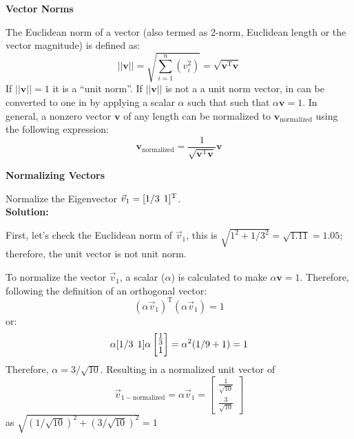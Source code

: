 \documentclass[12pt,letter]{article}
\begin{document}
	
		\begin{review}	
		\textbf{Vector Norms} 
		
	\noindent The Euclidean norm of a vector (also termed as 2-norm, Euclidean length or the vector magnitude) is defined as:
	\begin{equation}
	||\textbf{v}|| = \sqrt{\sum_{i=1}^{n}(v_i^2)} = \sqrt{\textbf{v}^{\text{T}}\textbf{v}}
	\end{equation} 
	If $||\textbf{v}|| = 1$ it is a ``unit norm''. If $||\textbf{v}||$ is not a a unit norm vector, in can be converted to one in by applying a scalar $\alpha$ such that such that $\alpha\textbf{v}=1$. In general, a nonzero vector $\textbf{v}$ of any length can be normalized to $\textbf{v}_\text{normalized}$ using the following expression:
		\begin{equation}
		\textbf{v}_\text{normalized} = \frac{1}{\sqrt{\textbf{v}^{\text{T}}\textbf{v}} } \textbf{v}
		\end{equation}
	\end{review}	

	
	
	 
	
	\begin{example}
	\label{ex:vector_normalizeation}

	\textbf{Normalizing Vectors}

	\noindent Normalize the Eigenvector $\vec{v}_1=[1/3 \hspace{1ex} 1]^\text{T}$. \\
		
	\noindent \textbf{Solution:} 
	
	\noindent First, let's check the Euclidean norm of $\vec{v}_1$, this is $\sqrt{1^2+1/3^2} = \sqrt{1.11} = 1.05$; therefore, the unit vector is not unit norm.
	
	To normalize the vector $\vec{v}_1$, a scalar ($\alpha$) is calculated to make $\alpha\textbf{v}=1$.  Therefore, following the definition of an orthogonal vector:
	\begin{equation}
	(\alpha \vec{v}_1)^\text{T}(\alpha \vec{v}_1) = 1
	\end{equation}
	or:
	\begin{equation}
	\alpha [1/3 \hspace{1ex} 1]\alpha  \begin{bmatrix} \frac{1}{3}\\  1 \end{bmatrix}  = \alpha^2(1/9+1) = 1
	\end{equation}
	Therefore, $\alpha=3/\sqrt{10}$. Resulting in a normalized unit vector of
	\begin{equation}
		\vec{v}_{1-\text{normalized}} = \alpha\vec{v}_1= \begin{bmatrix} \frac{1}{\sqrt{10}}\\  \frac{3}{\sqrt{10}} \end{bmatrix}
		\end{equation}
		 as $\sqrt{(1/\sqrt{10})^2 + (3/\sqrt{10})^2} =1$
	
	\end{example}	
	
\end{document}
